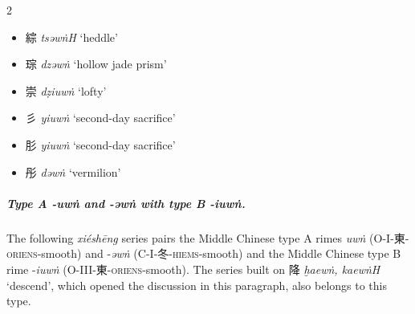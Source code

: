 \begin{multicols}{2}
\begin{minipage}{\columnwidth}
\begin{itemize}[leftmargin=*, labelsep=0.5em]
    \item {\Large{綜}} %
    \textit{tsəwṅH} `heddle' %

    \item {\Large{琮}} %
    \textit{dzəwṅ} `hollow jade prism' %

    \item {\Large{崇}} %
    \textit{dẓiuwṅ} `lofty' %
\end{itemize}
\end{minipage}

\medskip



\begin{itemize}
  \item {\Large{彡}} %
    \textit{yiuwṅ} `second-day sacrifice' %
  
  \item {\Large{肜}} %
    \textit{yiuwṅ} `second-day sacrifice' %


  \item {\Large{彤}} %
    \textit{dəwṅ} `vermilion' %
\end{itemize}
\end{multicols}

\subparagraph{Type A -\textit{uwṅ} and -\textit{əwṅ} with type B -\textit{iuwṅ}.}
\label{subpara:typeA-uwng-awng-typeB-iuwng}
The following \textit{xiéshēng} series pairs the Middle Chinese type A rimes 
\textit{uwṅ} (O-I-東-\textsc{oriens}-smooth) and -\textit{əwṅ}  (C-I-冬-\textsc{hiems}-smooth) and the Middle Chinese type B rime -\textit{iuwṅ} (O-III-東-\textsc{oriens}-smooth).
The series built on 降 
    \textit{ḫaewṅ, kaewṅH} `descend', which opened the discussion in this paragraph, also belongs to this type. 

    




